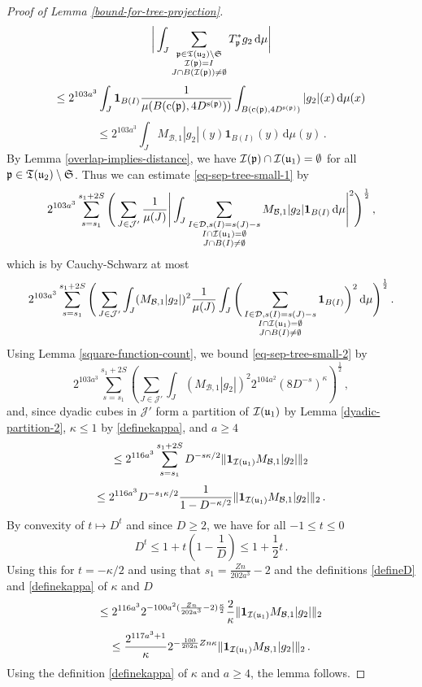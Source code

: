 {\begin{proof}[Proof of Lemma \ref{bound-for-tree-projection}]
    $$
        \bigg| \int_J \sum_{\substack{{\mathfrak p} \in {\mathfrak T}({\mathfrak u}_2) \setminus \mathfrak{S}\\ {\mathcal{I}}({\mathfrak p}) = I\\
        J \cap B({\mathcal{I}}({\mathfrak p})) \ne \emptyset}} T_{{\mathfrak p}}^* g_2 \, \mathrm{d}\mu \bigg|
    $$
    $$
        \le 2^{103a^3} \int_J \mathbf{1}_{B(I)} \frac{1}{\mu(B({\mathrm{c}}({\mathfrak p}), 4D^{{\mathrm{s}}({\mathfrak p})}))} \int_{B({\mathrm{c}}({\mathfrak p}), 4D^{{\mathrm{s}}({\mathfrak p})})} |g_2|(x) \, \mathrm{d}\mu(x)
    $$
    $$
        \le 2^{103a^3} \int_J M_{\mathcal{B},1} |g_2|(y) \mathbf{1}_{B(I)}(y) \, \mathrm{d}\mu(y)\,.
    $$
    By Lemma \ref{overlap-implies-distance}, we have ${\mathcal{I}}({\mathfrak p}) \cap {\mathcal{I}}({\mathfrak u}_1) = \emptyset$ for all ${\mathfrak p} \in {\mathfrak T}({\mathfrak u}_2) \setminus \mathfrak{S}$.
    Thus we can estimate \eqref{eq-sep-tree-small-1} by
    $$
        2^{103a^3} \sum_{s = s_1}^{s_1 + 2S} \Bigg( \sum_{J \in \mathcal{J}'} \frac{1}{\mu(J)} \Bigg|\int_J \sum_{\substack{I \in \mathcal{D}, s(I) = s(J) - s\\ I \cap {\mathcal{I}}({\mathfrak u}_1) = \emptyset\\
        J \cap B(I) \ne \emptyset}} M_{\mathcal{B},1} |g_2| \mathbf{1}_{B(I)} \, \mathrm{d}\mu \Bigg|^2\Bigg)^{\frac 1 2}\,,
    $$
    which is by Cauchy-Schwarz at most
    \begin{equation}
    \label{eq-sep-tree-small-2}
        2^{103a^3} \sum_{s = s_1}^{s_1 + 2S} \Bigg( \sum_{J \in \mathcal{J}'} \int_J  ( M_{\mathcal{B},1} |g_2|)^2 \frac{1}{\mu(J)} \int_J \Bigg(\sum_{\substack{I \in \mathcal{D}, s(I) = s(J) - s\\ I \cap {\mathcal{I}}({\mathfrak u}_1) = \emptyset\\
        J \cap B(I) \ne \emptyset}} \mathbf{1}_{B(I)}\bigg)^2 \, \mathrm{d}\mu \Bigg)^{\frac 12}\,.
    \end{equation}
    Using Lemma \ref{square-function-count}, we bound \eqref{eq-sep-tree-small-2} by
    $$
        2^{103a^3} \sum_{s = s_1}^{s_1 + 2S} \left(\sum_{J \in \mathcal{J}'} \int_J (M_{\mathcal{B},1} |g_2|)^2 2^{104a^2} (8 D^{-s})^\kappa\right)^{\frac 1 2}\,,
    $$
    and, since dyadic cubes in $\mathcal{J}'$ form a partition of ${\mathcal{I}}({\mathfrak u}_1)$ by Lemma \ref{dyadic-partition-2}, $\kappa \le 1$ by \eqref{definekappa}, and $a \ge 4$
    $$
        \le 2^{116a^3} \sum_{s = s_1}^{s_1 + 2S} D^{-s\kappa/2} \|\mathbf{1}_{{\mathcal{I}}({\mathfrak u}_1)} M_{\mathcal{B},1} |g_2|\|_2
    $$
    $$
        \le 2^{116a^3} D^{-s_1 \kappa /2} \frac{1}{1 - D^{-\kappa/2}} \|\mathbf{1}_{{\mathcal{I}}({\mathfrak u}_1)} M_{\mathcal{B},1} |g_2|\|_2\,.
    $$
    By convexity of $t \mapsto D^t$ and since $D \ge 2$, we have for all $-1 \le t \le 0$
    $$
        D^t \le 1 + t(1 - \frac{1}{D}) \le 1 + \frac{1}{2}t\,.
    $$
    Using this for $t = -\kappa/2$ and using that $s_1 = \frac{Zn}{202a^3} - 2$ and the definitions \eqref{defineD} and \eqref{definekappa} of $\kappa$ and $D$
    $$
        \le 2^{116a^3} 2^{-100a^2(\frac{Zn}{202a^3} - 2) \frac{\kappa}{2}} \frac{2}{\kappa} \|\mathbf{1}_{{\mathcal{I}}({\mathfrak u}_1)} M_{\mathcal{B},1} |g_2|\|_2
    $$
    $$
        \le \frac{2^{117a^3 + 1}}{\kappa} 2^{-\frac{100}{202a}Zn\kappa} \|\mathbf{1}_{{\mathcal{I}}({\mathfrak u}_1)} M_{\mathcal{B},1} |g_2|\|_2\,.
    $$
    Using the definition \eqref{definekappa} of $\kappa$ and $a \ge 4$, the lemma follows.
\end{proof}



}
